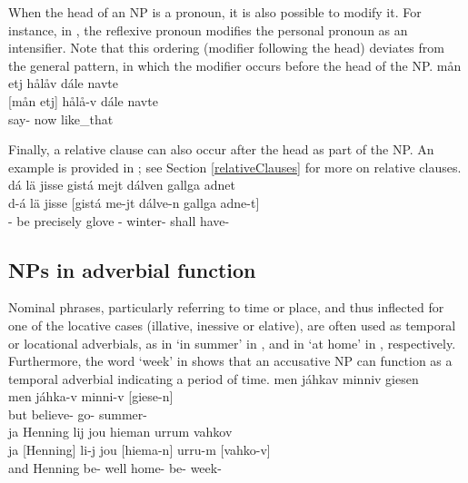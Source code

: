When the head of an NP is a pronoun, it is also possible to modify it. For instance, in , the  reflexive pronoun  modifies the  personal pronoun  as an intensifier. Note that this ordering (modifier following the head) deviates from the general pattern, in which the modifier occurs before the head of the NP. 
\ea\label{NPstructureProEx3}%
\glll	mån etj hålåv dále navte\\
	{[mån} {etj]\subNP} hålå-v dále navte\\
	 \BS{} say- now like\_that\\\nopagebreak
{}	
\z

Finally, a relative clause can also occur after the head as part of the NP. An example is provided in ; see Section \ref{relativeClauses} for more on relative clauses. 
\ea\label{NPstructureRelClEx1}%
\glll	dá lä jisse gistá mejt dálven gallga adnet\\
	d-á lä jisse {[gistá} me-jt dálve-n gallga {adne-t]\subNP}\\
	\BS{}- be\BS{} precisely glove\BS{} - winter- shall\BS{} have-\\\nopagebreak
{}	
\z


\subsection{NPs in adverbial function}\label{ADVnouns}
Nominal phrases, %
particularly referring to time or place, and thus inflected for one of the locative cases (illative, inessive or elative), are often used as temporal or locational adverbials, as in  ‘in summer’ in , and in  ‘at home’ in , respectively. Furthermore, the word  ‘week’ in  shows that an accusative NP can function as a temporal adverbial indicating a period of time. 
\ea\label{ADVnounsEx1}%
\glll	men jáhkav minniv giesen\\
	men jáhka-v minni-v {[giese-n]\subNP}\\
	but believe- go- summer-\\\nopagebreak
{}	
\z
\ea\label{ADVnounsEx2}
\glll	ja Henning lij jou hieman urrum vahkov\\
	ja {[Henning]\subNP{}} li-j jou {[hiema-n]\subNP{}} urru-m {[vahko-v]\subNP{}}\\
	and Henning\BS{} be- well home- be- week-\\\nopagebreak
{}	
\z


